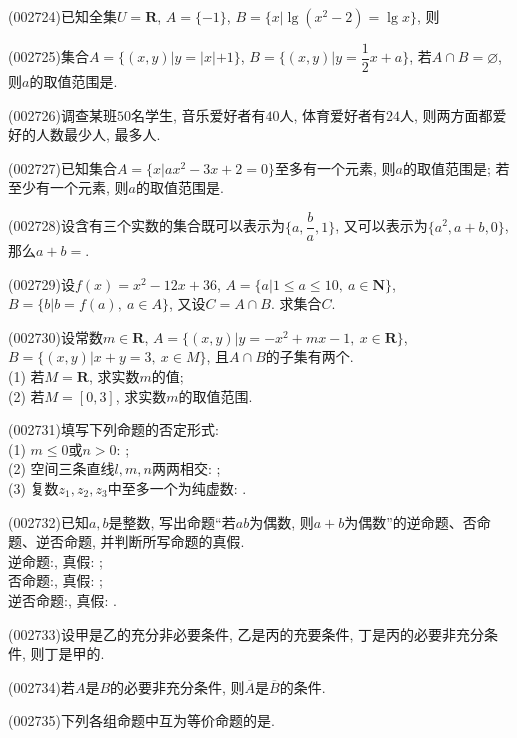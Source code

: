 \item (002724)已知全集$U=\mathbf{R}$, $A=\{-1\}$, $B=\{x|\lg (x^2-2)=\lg x\}$, 则
\item (002725)集合$A=\{(x,y)|y=|x|+1\}$, $B=\{(x,y)|y=\dfrac12x+a\}$, 若$A\cap B=\varnothing$, 则$a$的取值范围是.
\item (002726)调查某班$50$名学生, 音乐爱好者有$40$人, 体育爱好者有$24$人, 则两方面都爱好的人数最少人, 最多人.
\item (002727)已知集合$A=\{x|ax^2-3x+2=0\}$至多有一个元素, 则$a$的取值范围是; 若至少有一个元素, 则$a$的取值范围是.
\item (002728)设含有三个实数的集合既可以表示为$\{a,\dfrac ba,1\}$, 又可以表示为$\{a^2,a+b,0\}$, 那么$a+b=$.
\item (002729)设$f(x)=x^2-12x+36$, $A=\{a|1\le a\le 10, \ a\in \mathbf{N}\}$, $B=\{b|b=f(a),\ a\in A\}$, 又设$C=A\cap B$. 求集合$C$.
\item (002730)设常数$m\in \mathbf{R}$, $A=\{(x,y)|y=-x^2+mx-1,\ x\in \mathbf{R}\}$, $B=\{(x,y)|x+y=3,\ x\in M\}$, 且$A\cap B$的子集有两个.\\
(1) 若$M=\mathbf{R}$, 求实数$m$的值;\\
(2) 若$M=[0,3]$, 求实数$m$的取值范围.
\item (002731)填写下列命题的否定形式:\\
(1) $m\le 0$或$n>0$: ;\\
(2) 空间三条直线$l,m,n$两两相交: ;\\
(3) 复数$z_1,z_2,z_3$中至多一个为纯虚数: .
\item (002732)已知$a,b$是整数, 写出命题``若$ab$为偶数, 则$a+b$为偶数''的逆命题、否命题、逆否命题, 并判断所写命题的真假.\\
逆命题:, 真假: ;\\
否命题:, 真假: ;\\
逆否命题:, 真假: .
\item (002733)设甲是乙的充分非必要条件, 乙是丙的充要条件, 丁是丙的必要非充分条件, 则丁是甲的.
\item (002734)若$A$是$B$的必要非充分条件, 则$\overline{A}$是$\overline{B}$的条件.
\item (002735)下列各组命题中互为等价命题的是.
